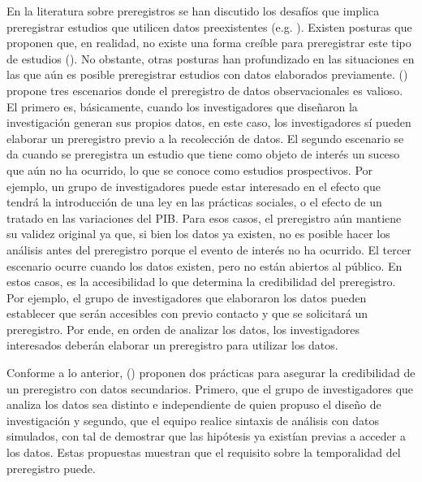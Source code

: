 \documentclass[
  spanish,
  a4paper,
  oneside]{scrbook}
\begin{document}
En la literatura sobre preregistros se han discutido los desafíos que
implica preregistrar estudios que utilicen datos preexistentes (e.g.
). Existen
posturas que proponen que, en realidad, no existe una forma creíble para
preregistrar este tipo de estudios
(). No obstante, otras posturas han profundizado en las situaciones
en las que aún es posible preregistrar estudios con datos elaborados
previamente. () propone
tres escenarios donde el preregistro de datos observacionales es
valioso. El primero es, básicamente, cuando los investigadores que
diseñaron la investigación generan sus propios datos, en este caso, los
investigadores sí pueden elaborar un preregistro previo a la recolección
de datos. El segundo escenario se da cuando se preregistra un estudio
que tiene como objeto de interés un suceso que aún no ha ocurrido, lo
que se conoce como estudios prospectivos. Por ejemplo, un grupo de
investigadores puede estar interesado en el efecto que tendrá la
introducción de una ley en las prácticas sociales, o el efecto de un
tratado en las variaciones del PIB. Para esos casos, el preregistro aún
mantiene su validez original ya que, si bien los datos ya existen, no es
posible hacer los análisis antes del preregistro porque el evento de
interés no ha ocurrido. El tercer escenario ocurre cuando los datos
existen, pero no están abiertos al público. En estos casos, es la
accesibilidad lo que determina la credibilidad del preregistro. Por
ejemplo, el grupo de investigadores que elaboraron los datos pueden
establecer que serán accesibles con previo contacto y que se solicitará
un preregistro. Por ende, en orden de analizar los datos, los
investigadores interesados deberán elaborar un preregistro para utilizar
los datos.

Conforme a lo anterior,
()
proponen dos prácticas para asegurar la credibilidad de un preregistro
con datos secundarios. Primero, que el grupo de investigadores que
analiza los datos sea distinto e independiente de quien propuso el
diseño de investigación y segundo, que el equipo realice sintaxis de
análisis con datos simulados, con tal de demostrar que las hipótesis ya
existían previas a acceder a los datos. Estas propuestas muestran que el
requisito sobre la temporalidad del preregistro puede.
\end{document}
